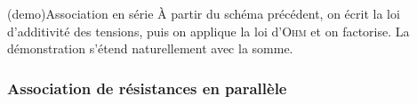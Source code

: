 \documentclass[../../main/main.tex]{subfiles}
\begin{document}
\begin{tcb*}[label=demo:rserie, sidebyside, righthand ratio=.4](demo){Association en série}
	À partir du schéma précédent, on écrit la loi d'additivité des tensions,
	puis on applique la loi d'\textsc{Ohm} et on factorise.
	\smallbreak
	La démonstration s'étend naturellement avec la somme.
	\tcblower
\end{tcb*}

\subsubsection{Association de résistances en parallèle}
\end{document}
